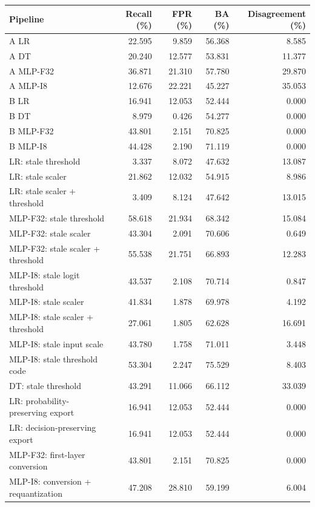 \begin{tabular}{lrrrr}
\toprule
Pipeline & Recall (\%) & FPR (\%) & BA (\%) & Disagreement (\%) \\
\midrule
A LR & 22.595 & 9.859 & 56.368 & 8.585 \\
A DT & 20.240 & 12.577 & 53.831 & 11.377 \\
A MLP-F32 & 36.871 & 21.310 & 57.780 & 29.870 \\
A MLP-I8 & 12.676 & 22.221 & 45.227 & 35.053 \\
\midrule
B LR & 16.941 & 12.053 & 52.444 & 0.000 \\
B DT & 8.979 & 0.426 & 54.277 & 0.000 \\
B MLP-F32 & 43.801 & 2.151 & 70.825 & 0.000 \\
B MLP-I8 & 44.428 & 2.190 & 71.119 & 0.000 \\
\midrule
LR: stale threshold & 3.337 & 8.072 & 47.632 & 13.087 \\
LR: stale scaler & 21.862 & 12.032 & 54.915 & 8.986 \\
LR: stale scaler + threshold & 3.409 & 8.124 & 47.642 & 13.015 \\
MLP-F32: stale threshold & 58.618 & 21.934 & 68.342 & 15.084 \\
MLP-F32: stale scaler & 43.304 & 2.091 & 70.606 & 0.649 \\
MLP-F32: stale scaler + threshold & 55.538 & 21.751 & 66.893 & 12.283 \\
MLP-I8: stale logit threshold & 43.537 & 2.108 & 70.714 & 0.847 \\
MLP-I8: stale scaler & 41.834 & 1.878 & 69.978 & 4.192 \\
MLP-I8: stale scaler + threshold & 27.061 & 1.805 & 62.628 & 16.691 \\
MLP-I8: stale input scale & 43.780 & 1.758 & 71.011 & 3.448 \\
MLP-I8: stale threshold code & 53.304 & 2.247 & 75.529 & 8.403 \\
DT: stale threshold & 43.291 & 11.066 & 66.112 & 33.039 \\
\midrule
LR: probability-preserving export & 16.941 & 12.053 & 52.444 & 0.000 \\
LR: decision-preserving export & 16.941 & 12.053 & 52.444 & 0.000 \\
MLP-F32: first-layer conversion & 43.801 & 2.151 & 70.825 & 0.000 \\
MLP-I8: conversion + requantization & 47.208 & 28.810 & 59.199 & 6.004 \\
\bottomrule
\end{tabular}

